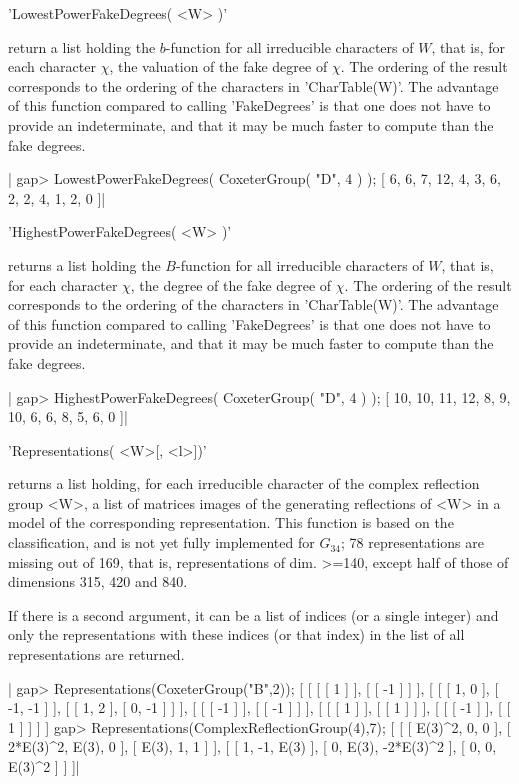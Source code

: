 'LowestPowerFakeDegrees( <W> )'

return a list holding the $b$-function for all irreducible characters of
$W$,  that is,  for each  character $\chi$,  the valuation  of the  fake
degree of $\chi$. The ordering of the result corresponds to the ordering
of  the characters  in 'CharTable(W)'.  The advantage  of this  function
compared to calling  'FakeDegrees' is that one does not  have to provide
an indeterminate,  and that it  may be much  faster to compute  than the
fake degrees.

|    gap> LowestPowerFakeDegrees( CoxeterGroup( "D", 4 ) );
    [ 6, 6, 7, 12, 4, 3, 6, 2, 2, 4, 1, 2, 0 ]|


'HighestPowerFakeDegrees( <W> )'

returns a list  holding the $B$-function for  all irreducible characters
of  $W$, that  is, for  each character  $\chi$, the  degree of  the fake
degree of $\chi$. The ordering of the result corresponds to the ordering
of  the characters  in 'CharTable(W)'.  The advantage  of this  function
compared to calling  'FakeDegrees' is that one does not  have to provide
an indeterminate,  and that it  may be much  faster to compute  than the
fake degrees.

|    gap> HighestPowerFakeDegrees( CoxeterGroup( "D", 4 ) );
    [ 10, 10, 11, 12, 8, 9, 10, 6, 6, 8, 5, 6, 0 ]|


'Representations( <W>[, <l>])'

returns  a  list  holding,  for  each  irreducible character of the complex
reflection  group  <W>,  a  list  of  matrices  images  of  the  generating
reflections  of <W>  in a  model of  the corresponding representation. This
function  is based on the classification,  and is not yet fully implemented
for  $G_{34}$;  78  representations  are  missing  out  of  169,  that  is,
representations  of dim. >=140, except half of those of dimensions 315, 420
and 840.

If  there is a  second argument, it  can be a  list of indices (or a single
integer) and only the representations with these indices (or that index) in
the list of all representations are returned.

|    gap> Representations(CoxeterGroup("B",2));
    [ [ [ [ 1 ] ], [ [ -1 ] ] ],
      [ [ [ 1, 0 ], [ -1, -1 ] ], [ [ 1, 2 ], [ 0, -1 ] ] ],
      [ [ [ -1 ] ], [ [ -1 ] ] ], [ [ [ 1 ] ], [ [ 1 ] ] ],
      [ [ [ -1 ] ], [ [ 1 ] ] ] ]
    gap> Representations(ComplexReflectionGroup(4),7);
    [ [ [ E(3)^2, 0, 0 ], [ 2*E(3)^2, E(3), 0 ], [ E(3), 1, 1 ] ],
      [ [ 1, -1, E(3) ], [ 0, E(3), -2*E(3)^2 ], [ 0, 0, E(3)^2 ] ] ]|

